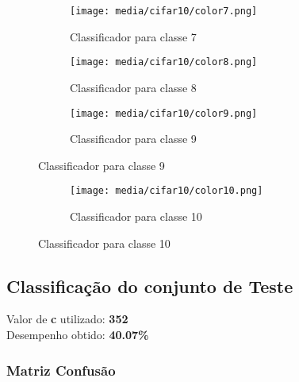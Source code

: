 \documentclass[a4paper]{article}
\begin{document}
\begin{figure}[H]
    \centering
    \begin{subfigure}{.33\textwidth}
        \centerline{\texttt{[image: media/cifar10/color7.png]}}
        \caption{Classificador para classe 7}
        \label{fig:fig9}
    \end{subfigure}%
    \begin{subfigure}{.33\textwidth}
        \centerline{\texttt{[image: media/cifar10/color8.png]}}
        \caption{Classificador para classe 8}
        \label{fig:fig10}
    \end{subfigure}%
    \begin{subfigure}{.33\textwidth}
        \centerline{\texttt{[image: media/cifar10/color9.png]}}
        \caption{Classificador para classe 9}
        \label{fig:fig11}
    \end{subfigure}
\end{figure}

\begin{figure}[H]
    \centering
    \begin{subfigure}{.33\textwidth}
        \centerline{\texttt{[image: media/cifar10/color10.png]}}
        \caption{Classificador para classe 10}
        \label{fig:fig12}
    \end{subfigure}%
\end{figure}

\subsection{Classificação do conjunto de Teste}

Valor de \textbf{c} utilizado: \textbf{352} \\
Desempenho obtido: \textbf{40.07\%}

\subsubsection{Matriz Confusão}
\end{document}
